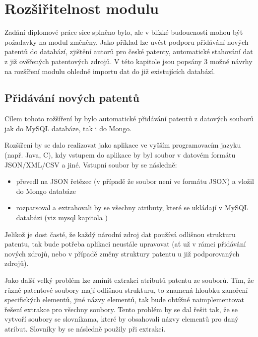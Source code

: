 \chapter{Rozšiřitelnost modulu}
Zadání diplomové práce sice splněno bylo, ale v blízké budoucnosti mohou být požadavky na modul změněny. Jako příklad lze uvést podporu přidávání nových patentů do databází, zjištění autorů pro české patenty, automatické stahování dat z již ověřených patentových zdrojů. V této kapitole jsou popsány 3 možné návrhy na rozšíření modulu ohledně importu dat do již existujících databází.

\section{Přidávání nových patentů} \label{sec:new_patenty}
Cílem tohoto rožšíření by bylo automatické přidávání patentů z datových souborů jak do MySQL databáze, tak i do Mongo.

Rozšíření by se dalo realizovat jako aplikace ve vyšším programovacím jazyku (např. Java, C), kdy vstupem do aplikace by byl soubor v datovém formátu JSON/XML/CSV a jiné. Vstupní soubor by se následně:
\begin{itemize}
\item převedl na JSON řetězec (v případě že soubor není ve formátu JSON) a vložil do Mongo databáze
\item rozparsoval a extrahovali by se všechny atributy, které se ukládají v MySQL databázi (viz mysql kapitola )
\end{itemize}

Jelikož je dost časté, že každý národní zdroj dat používá odlišnou strukturu patentu, tak bude potřeba aplikaci neustále upravovat (ať už v rámci přidávání nových zdrojů, nebo v případě změny struktury patentu u již podporovaných zdrojů).

Jako další velký problém lze zmínit extrakci atributů patentu ze souborů. Tím, že různé patentové soubory mají odlišnou strukturu, to znamená hloubku zanoření specifických elementů, jiné názvy elementů, tak bude obtížné naimplementovat řešení extrakce pro všechny soubory. Tento problém by se dal řešit tak, že se vytvoří soubory se slovníkama, které by obsahovali názvy elementů pro daný atribut. Slovníky by se následně použily při extrakci.

